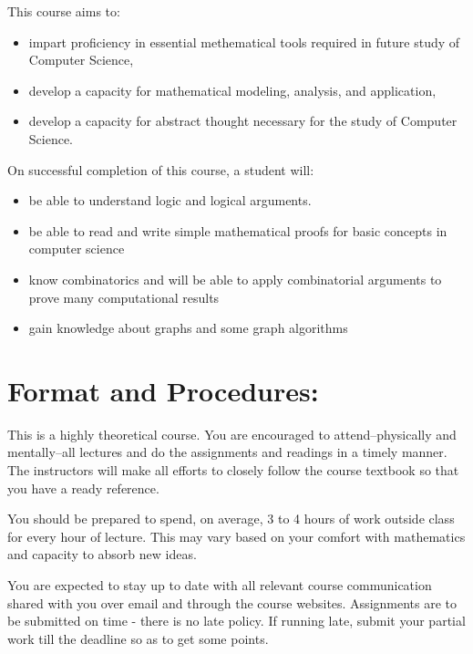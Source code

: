 \documentclass[a4paper]{article}
\begin{document}
This course aims to:
\begin{itemize}
\item impart proficiency in essential methematical tools required in future study of Computer Science,
\item develop a capacity for mathematical modeling, analysis, and application,
\item develop a capacity for abstract thought necessary for the study of Computer Science.
\end{itemize}

On successful completion of this course, a student will:
\begin{itemize}
	\item be able to understand logic and logical arguments.
	
	\item be able to read and write simple mathematical proofs for basic concepts in computer science
	
	\item know combinatorics and will be able to apply combinatorial arguments to prove many computational results
	
	\item gain knowledge about graphs and some graph algorithms
\end{itemize}

\section{Format and Procedures:}

This is a highly theoretical course. You are encouraged to attend--physically and mentally--all lectures and do the assignments and readings in a timely manner. The instructors will make all efforts to closely follow the course textbook so that you have a ready reference.

You should be prepared to spend, on average, 3 to 4 hours of work outside class for every hour of lecture. This may vary based on your comfort with mathematics and capacity to absorb new ideas.

You are expected to stay up to date with all relevant course communication shared with you over email and through the course websites.  Assignments are to be submitted on time - there is no late policy. If running late, submit your partial work till the deadline so as to get some points.

\end{document}

